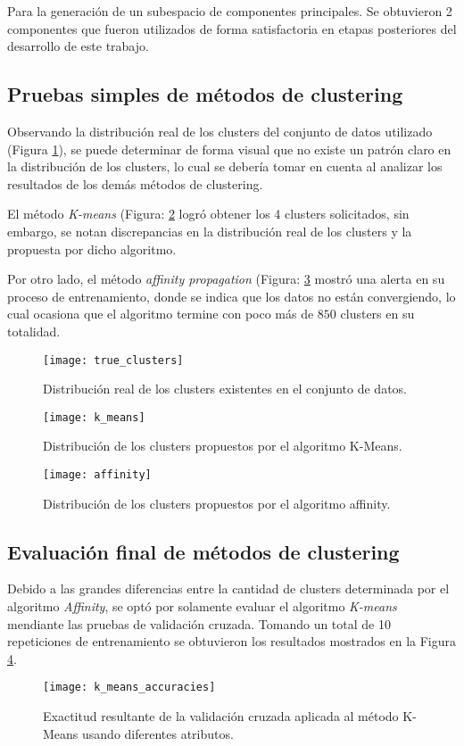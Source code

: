 Para la generación de un subespacio de componentes principales. Se obtuvieron 2 componentes que fueron utilizados de forma satisfactoria en etapas posteriores del desarrollo de este trabajo.

\subsection{Pruebas simples de métodos de clustering}
Observando la distribución real de los clusters del conjunto de datos utilizado (Figura \ref{Fig. TrueClue}), se puede determinar de forma visual que no existe un patrón claro en la distribución de los clusters, lo cual se debería tomar en cuenta al analizar los resultados de los demás métodos de clustering.

El método \emph{K-means} (Figura: \ref{Fig. KMeans} logró obtener los 4 clusters solicitados, sin embargo, se notan discrepancias en la distribución real de los clusters y la propuesta por dicho algoritmo.

Por otro lado, el método \emph{affinity propagation} (Figura: \ref{Fig. AffP} mostró una alerta en su proceso de entrenamiento, donde se indica que los datos no están convergiendo, lo cual ocasiona que el algoritmo termine con poco más de $850$ clusters en su totalidad.

\begin{figure}[ht]
	\centering
	\texttt{[image: true\_clusters]}
	\caption{Distribución real de los clusters existentes en el conjunto de datos.}
	\label{Fig. TrueClue}
\end{figure}

\begin{figure}[ht]
	\centering
	\texttt{[image: k\_means]}
	\caption{Distribución de los clusters propuestos por el algoritmo K-Means.}
	\label{Fig. KMeans}
\end{figure}

\begin{figure}[ht]
	\centering
	\texttt{[image: affinity]}
	\caption{Distribución de los clusters propuestos por el algoritmo affinity.}
	\label{Fig. AffP}
\end{figure}

\FloatBarrier
\subsection{Evaluación final de métodos de clustering}
Debido a las grandes diferencias entre la cantidad de clusters determinada por el algoritmo \emph{Affinity}, se optó por solamente evaluar el algoritmo \emph{K-means} mendiante las pruebas de validación cruzada. Tomando un total de 10 repeticiones de entrenamiento se obtuvieron los resultados mostrados en la Figura \ref{Fig. KFold}.

\begin{figure}[ht]
	\centering
	\texttt{[image: k\_means\_accuracies]}
	\caption{Exactitud resultante de la validación cruzada aplicada al método K-Means usando diferentes atributos.}
	\label{Fig. KFold}
\end{figure}

